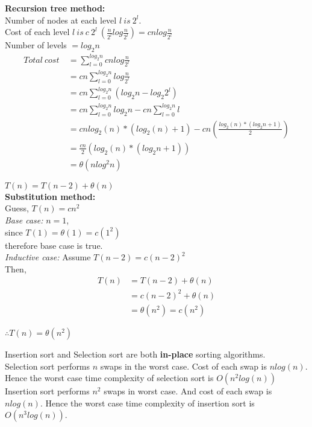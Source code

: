 \documentclass[12pt,twoside]{article}
\begin{document}
\begin{problems}
\begin{problemparts}
\textbf{Recursion tree method:} \\
Number of nodes at each level $l\ is\ 2^l$. \\
Cost of each level $l\ is\ c\ 2^l\ \left( \frac{n}{2^l} log\frac{n}{2^l}\right) = c n log\frac{n}{2^l}$ \\
Number of levels $= log_2 n$ 
\begin{align*}
    Total\ cost\ &= \sum_{l=0}^{log_2 n} c n log\frac{n}{2^l} \\
                 &= c n \sum_{l=0}^{log_2 n} log\frac{n}{2^l} \\
                 &= c n \sum_{l=0}^{log_2 n} \left(log_2 n - log_2 2^l \right) \\
                 &= c n \sum_{l=0}^{log_2 n} log_2 n - c n \sum_{l=0}^{log_2 n} l \\
                 &= c n log_2 (n) * (log_2(n) + 1) - c n \left( \frac{log_2(n) * (log_2 n + 1)}{2}\right) \\
                 &= \frac{c n}{2} \left(log_2(n) * (log_2 n + 1)\right) \\
                 &= \theta(nlog^2 n)
\end{align*}

\newpage
\problempart %
$T(n) = T(n-2) + \theta(n)$ \\
\textbf{Substitution method:} \\
Guess, $T(n) = cn^2$ \\

\textit{Base case:}  $n = 1$, \\
since $T(1) = \theta(1) = c(1^2)$ \\
therefore base case is true. \\

\textit{Inductive case:} Assume $T(n-2) = c (n-2)^2$ \\
Then, \\
\begin{align*}
    T(n) &= T(n-2) + \theta(n) \\
         &= c(n-2)^2 + \theta(n) \\
         &= \theta(n^2) = c(n^2)
\end{align*}

$\therefore T(n) = \theta(n^2)$
\end{problemparts}

\newpage
\problem  %

\begin{problemparts}
\problempart %
Insertion sort and Selection sort are both \textbf{in-place} sorting algorithms. \\
Selection sort performs $n$ swaps in the worst case. Cost of each swap is $nlog(n)$. \\ 
Hence the worst case time complexity of selection sort is $O(n^2 log(n))$ \\
Insertion sort performs $n^2$ swaps in worst case. And cost of each swap is $nlog(n)$. Hence the worst case time complexity of insertion sort is $O(n^3 log(n))$. \\


\end{problemparts}
\end{problems}
\end{document}
